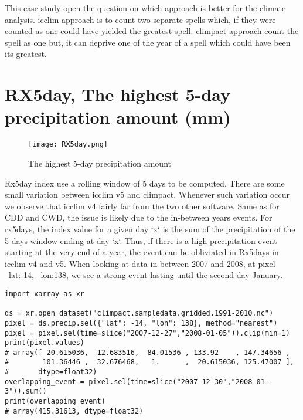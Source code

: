 \documentclass[a4paper,11pt]{article}
\begin{document}
            This case study open the question on which approach is better for the climate analysis.
            icclim approach is to count two separate spells which, if they were counted as one could have yielded the greatest spell.
            climpact approach count the spell as one but, it can deprive one of the year of a spell which could have been its greatest.

    \section{RX5day, The highest 5-day precipitation amount (mm)}
        \begin{figure}[!hbt]
            \centering
            \texttt{[image: RX5day.png]}
            \caption{The highest 5-day precipitation amount}
            \label{figure/rx5day}
        \end{figure}
        Rx5day index use a rolling window of 5 days to be computed.
        There are some small variation between icclim v5 and climpact. Whenever such variation occur we observe that icclim v4 fairly far from 
        the two other software.
        Same as for CDD and CWD, the issue is likely due to the in-between years events.
        For rx5days, the index value for a given day `x` is the sum of the precipitation of the 5 days window ending at day `x`.
        Thus, if there is a high precipitation event starting at the very end of a year, the event can be obliviated in Rx5days in icclim v4 and v5.
        When looking at data in between 2007 and 2008, at pixel ~lat:-14, ~lon:138, we see a strong event lasting until the second day January.
        \begin{minipage}{\linewidth}
        \begin{lstlisting}
import xarray as xr

ds = xr.open_dataset("climpact.sampledata.gridded.1991-2010.nc")
pixel = ds.precip.sel({"lat": -14, "lon": 138}, method="nearest")
pixel = pixel.sel(time=slice("2007-12-27","2008-01-05")).clip(min=1)
print(pixel.values)
# array([ 20.615036,  12.683516,  84.01536 , 133.92    , 147.34656 ,
#        101.36446 ,  32.676468,   1.      ,  20.615036, 125.47007 ],
#       dtype=float32)
overlapping_event = pixel.sel(time=slice("2007-12-30","2008-01-3")).sum()
print(overlapping_event)
# array(415.31613, dtype=float32)
        \end{lstlisting}
        \end{minipage}
\end{document}
